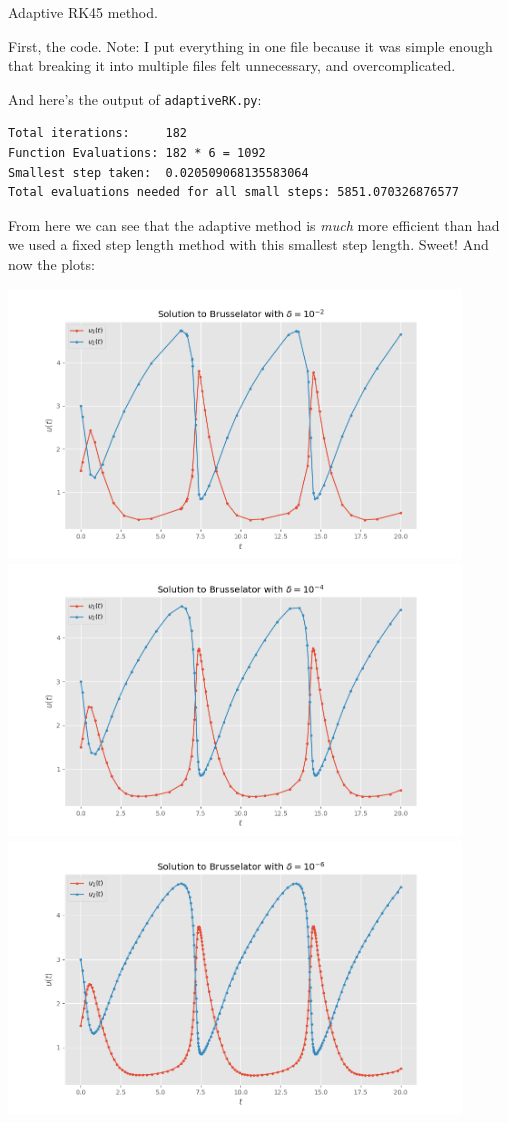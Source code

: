 \documentclass[boxes,pages]{homework}
\begin{document}

\begin{problem}
Adaptive RK45 method.
\end{problem}

\begin{solution}
	First, the code. Note: I put everything in one file because it was simple enough that breaking it into multiple files felt unnecessary, and overcomplicated.
	
	And here's the output of \verb|adaptiveRK.py|:
	\begin{verbatim}Total iterations:     182
Function Evaluations: 182 * 6 = 1092
Smallest step taken:  0.020509068135583064
Total evaluations needed for all small steps: 5851.070326876577\end{verbatim}
	From here we can see that the adaptive method is \emph{much} more efficient than had we used a fixed step length method with this smallest step length. Sweet!
	And now the plots:
	\begin{center}
		\includegraphics[width=0.9\textwidth]{10-2.png}
		\includegraphics[width=0.9\textwidth]{10-4.png}
		\includegraphics[width=0.9\textwidth]{10-6.png}

\end{center}
\end{solution}
\end{document}
